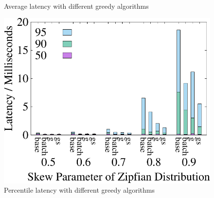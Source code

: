 \begin{figure}[t]
\begin{minipage}[b]{0.31\linewidth}
	\caption{Average latency with different greedy algorithms}
	\label{fig:greedy:latency}
	\end{minipage}
    \begin{minipage}[b]{0.31\linewidth}
        \centering
        \includegraphics[width=\textwidth]{./exp_fig/greedy/percent95_latency}
        \caption{Percentile latency with different greedy algorithms}
        \label{fig:greedy:p95}
    \end{minipage}
\end{figure}


